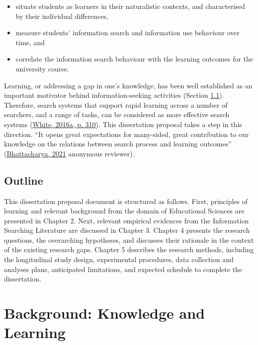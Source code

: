 \documentclass[a4paper, nobind]{templates/ociamthesis}
\begin{document}
\begin{itemize}
\item
  situate students as learners in their naturalistic contexts, and
  characterised by their individual differences,
\item
  measure students' information search and information use behaviour
  over time, and
\item
  correlate the information search behaviour with the learning
  outcomes for the university course.
\end{itemize}

Learning, or addressing a gap in one's knowledge, has been well
established as an important motivator behind information-seeking
activities (Section \protect\hyperlink{sec:intro_overview}{1.1}). Therefore, search systems that support
rapid learning across a number of searchers, and a range of tasks, can
be considered as more effective search systems (\protect\hyperlink{ref-white2016interactions}{White, 2016a, p. 310}). This dissertation proposal takes a step in this direction. ``It
opens great expectations for many-sided, great contribution to our
knowledge on the relations between search process and learning outcomes''
(\protect\hyperlink{ref-bhattacharya2021longitudinal}{Bhattacharya, 2021} anonymous reviewer).

\hypertarget{sec:intro_outline}{%
\section{Outline}\label{sec:intro_outline}}

This dissertation proposal document is structured as follows. First,
principles of learning and relevant background from the domain of
Educational Sciences are presented in Chapter 2. Next, relevant
empirical evidences from the Information Searching Literature are
discussed in Chapter 3. Chapter 4 presents the research questions, the
overarching hypotheses, and discusses their rationale in the context of
the existing research gaps. Chapter 5 describes the research methods,
including the longitudinal study design, experimental procedures, data
collection and analyses plans, anticipated limitations, and expected
schedule to complete the dissertation.

\hypertarget{ch:bg_learn}{%
\chapter{Background: Knowledge and Learning}\label{ch:bg_learn}}
\end{document}
